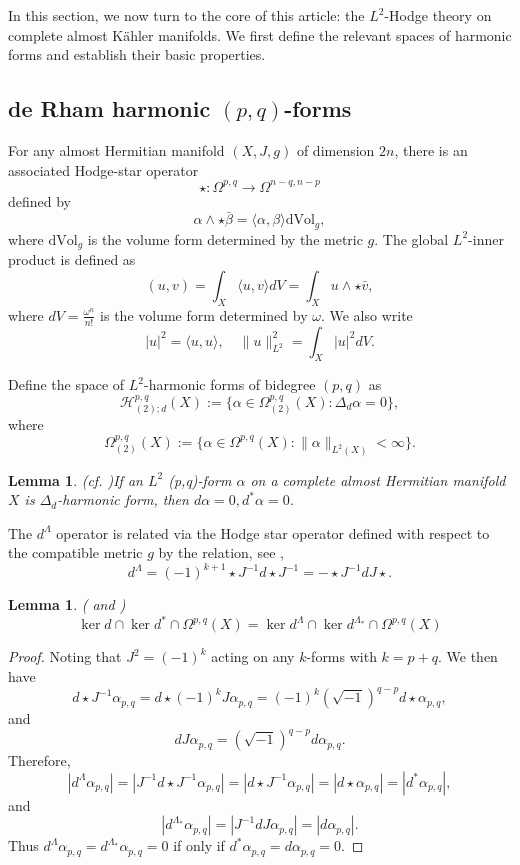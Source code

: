 \documentclass[12pt, twoside]{article}
\newtheorem{lemma}[theorem]{Lemma}
\theoremstyle{definition}
\numberwithin{equation}{section}
\def \a {\alpha }
\def \b {\beta}
\def \De {\Delta}
\def \La {\Lambda}
\def\w {\omega}
\def\Om{\Omega}
\begin{document}
	In this section, we now turn to the core of this article: the $L^{2}$-Hodge theory on complete almost Kähler manifolds. We first define the relevant spaces of harmonic forms and establish their basic properties.
	
	\subsection{de Rham harmonic $(p,q)$-forms}
	
	For any almost Hermitian manifold $(X,J,g)$ of dimension $2n$, there is an
	associated Hodge-star operator 
	\[\star:\Om^{p,q}\rightarrow \Om^{n-q,n-p}\]
	defined by 
	\[\a\wedge\star\bar{\b}=\langle\a,\b\rangle\mathrm{dVol}_{g},\]
	where $\mathrm{dVol}_{g}$ is the volume form determined by the metric $g$. The global $L^{2}$-inner product is defined as
	\[ (u,v)=\int_{X}\langle u,v\rangle dV=\int_{X}u\wedge\star\bar{v},\]
	where $dV=\frac{\w^{n}}{n!}$ is the volume form determined by $\w$. We also write 
	\[|u|^{2}=\langle u,u\rangle, \quad\|u\|_{L^2}^{2}=\int_{X}|u|^{2}dV. \]
	
	Define the space of  $L^{2}$-harmonic forms of bidegree $(p,q)$ as 
$$\mathcal{H}^{p,q}_{(2);d}(X):=\{\a\in\Om^{p,q}_{(2)}(X):\De_{d}\a=0 \},$$
where
$$\Om^{p,q}_{(2)}(X):=\{\a\in\Om^{p,q}(X):\|\a\|_{L^{2}(X)}<\infty\}.$$

\begin{lemma}(cf. \cite[Lemma 3.3]{Hua22})\label{L1}
If an $L^{2}$ (p,q)-form $\a$ on a complete almost Hermitian manifold $X$ is $\De_{d}$-harmonic form, then $d\a=0, d^{\ast}\a=0$.	
\end{lemma}

The $d^{\La}$ operator is related via the Hodge star operator defined with respect to the compatible metric $g$ by the relation, see \cite[Lemma 2.9]{Tseng-Yau},
$$d^{\La}=(-1)^{k+1}\star J^{-1}d\star J^{-1}=-{\star}J^{-1}dJ\star.$$

\begin{lemma}(\cite[Theorem 6.7]{TT} and \cite[Lemma 3.2]{Hua22})\label{L6}
		\begin{equation*}
		\ker d\cap\ker d^{\ast}\cap\Om^{p,q}(X)=\ker d^{\La}\cap\ker d^{\La_{\ast} }\cap\Om^{p,q}(X)
		\end{equation*}
	\end{lemma}
	\begin{proof}
		Noting that $J^{2}=(-1)^{k}$ acting on any $k$-forms with $k=p+q$. We then have 
		$$d\star J^{-1}\a_{p,q}=d\star(-1)^{k}J\a_{p,q}=(-1)^{k}(\sqrt{-1})^{q-p}d\star\a_{p,q},$$
		and
		$$dJ\a_{p,q}=(\sqrt{-1})^{q-p}d\a_{p,q}.$$
		Therefore,
		\begin{equation*}
		|d^{\La}\a_{p,q}|=|J^{-1}d\star J^{-1}\a_{p,q}|=|d\star J^{-1}\a_{p,q}|=|d\star\a_{p,q}|=|d^{\ast}\a_{p,q}|,
		\end{equation*}  
		and
		$$|d^{\La_{\ast}}\a_{p,q}|=|J^{-1}dJ\a_{p,q}|=|d\a_{p,q}|.$$
	Thus $d^{\La}\a_{p,q}=d^{\La_{\ast}}\a_{p,q}=0$ if only if $d^{\ast}\a_{p,q}=d\a_{p,q}=0$. 
	\end{proof}
	
\end{document}
